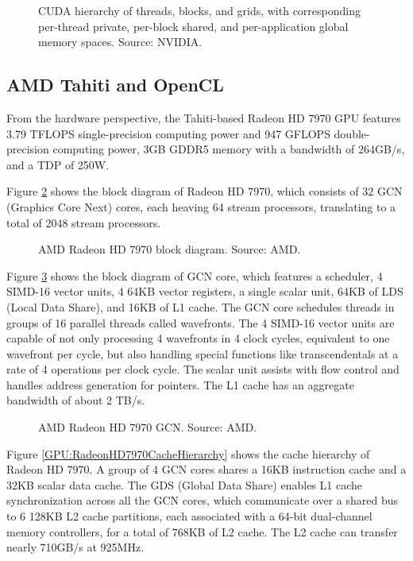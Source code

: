 \begin{figure}
\centering
\caption{CUDA hierarchy of threads, blocks, and grids, with corresponding per-thread private, per-block shared, and per-application global memory spaces. Source: NVIDIA.}
\label{GPU:CUDAMemoryHierarchy}
\end{figure}

\subsection{AMD Tahiti and OpenCL}

From the hardware perspective, the Tahiti-based Radeon HD 7970 GPU features 3.79 TFLOPS single-precision computing power and 947 GFLOPS double-precision computing power, 3GB GDDR5 memory with a bandwidth of 264GB/s, and a TDP of 250W.

Figure \ref{GPU:RadeonHD7970BlockDiagram} shows the block diagram of Radeon HD 7970, which consists of 32 GCN (Graphics Core Next) cores, each heaving 64 stream processors, translating to a total of 2048 stream processors.

\begin{figure}[t]
\centering
\caption{AMD Radeon HD 7970 block diagram. Source: AMD.}
\label{GPU:RadeonHD7970BlockDiagram}
\end{figure}

Figure \ref{GPU:RadeonHD7970GCN} shows the block diagram of GCN core, which features a scheduler, 4 SIMD-16 vector units, 4 64KB vector registers, a single scalar unit, 64KB of LDS (Local Data Share), and 16KB of L1 cache. The GCN core schedules threads in groups of 16 parallel threads called wavefronts. The 4 SIMD-16 vector units are capable of not only processing 4 wavefronts in 4 clock cycles, equivalent to one wavefront per cycle, but also handling special functions like transcendentals at a rate of 4 operations per clock cycle. The scalar unit assists with flow control and handles address generation for pointers. The L1 cache has an aggregate bandwidth of about 2 TB/s.

\begin{figure}
\centering
\caption{AMD Radeon HD 7970 GCN. Source: AMD.}
\label{GPU:RadeonHD7970GCN}
\end{figure}

Figure \ref{GPU:RadeonHD7970CacheHierarchy} shows the cache hierarchy of Radeon HD 7970. A group of 4 GCN cores shares a 16KB instruction cache and a 32KB scalar data cache. The GDS (Global Data Share) enables L1 cache synchronization across all the GCN cores, which communicate over a shared bus to 6 128KB L2 cache partitions, each associated with a 64-bit dual-channel memory controllers, for a total of 768KB of L2 cache. The L2 cache can transfer nearly 710GB/s at 925MHz.

